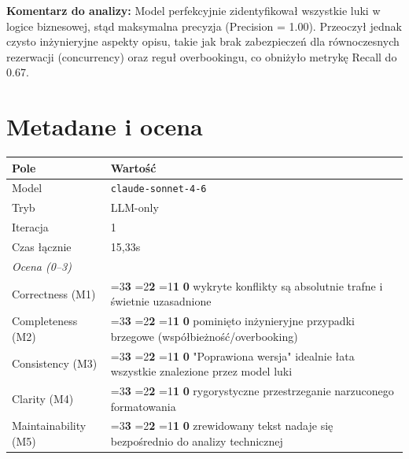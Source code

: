 \documentclass[12pt,a4paper]{article}
\newcommand{\scorebox}[1]{%
  \ifnum#1=3\colorbox{score3}{\textbf{3}}%
  \else\ifnum#1=2\colorbox{score2}{\textbf{2}}%
  \else\ifnum#1=1\colorbox{score1}{\textbf{1}}%
  \else\colorbox{score0}{\textbf{0}}\fi\fi\fi
}
\begin{document}
\vspace{0.5em}
\begin{mdframed}[backgroundcolor=metabg, linewidth=0pt, innerleftmargin=10pt, innerrightmargin=10pt, innertopmargin=6pt, innerbottommargin=6pt]
\small\textbf{Komentarz do analizy:} Model perfekcyjnie zidentyfikował wszystkie luki w logice biznesowej, stąd maksymalna precyzja (Precision = 1.00). Przeoczył jednak czysto inżynieryjne aspekty opisu, takie jak brak zabezpieczeń dla równoczesnych rezerwacji (concurrency) oraz reguł overbookingu, co obniżyło metrykę Recall do 0.67.
\end{mdframed}

\section{Metadane i ocena}
\begin{table}[h]
\begin{tabularx}{\textwidth}{l X}
\toprule
\textbf{Pole} & \textbf{Wartość} \\
\midrule
Model & \texttt{claude-sonnet-4-6} \\
Tryb & LLM-only \\
Iteracja & 1 \\
Czas łącznie & 15,33s \\
\midrule
\multicolumn{2}{l}{\textit{Ocena (0--3)}} \\
\midrule
Correctness (M1)     & \scorebox{3} \quad wykryte konflikty są absolutnie trafne i świetnie uzasadnione \\
Completeness (M2)    & \scorebox{2} \quad pominięto inżynieryjne przypadki brzegowe (współbieżność/overbooking) \\
Consistency (M3)     & \scorebox{3} \quad "Poprawiona wersja" idealnie łata wszystkie znalezione przez model luki \\
Clarity (M4)         & \scorebox{3} \quad rygorystyczne przestrzeganie narzuconego formatowania \\
Maintainability (M5) & \scorebox{3} \quad zrewidowany tekst nadaje się bezpośrednio do analizy technicznej \\
\bottomrule
\end{tabularx}
\end{table}
\end{document}
